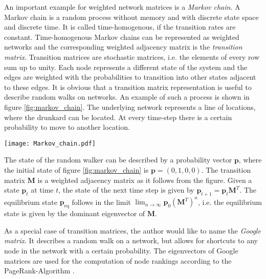 \documentclass[openright,twoside,headsepline]{scrbook}
\begin{document}
An important example for weighted network matrices is a \emph{Markov chain}.
A Markov chain is a random process without memory and with discrete state space and discrete time.
It is called time-homogenous, if the transition rates are constant.
Time-homogenous Markov chains can be represented as weighted networks and the corresponding weighted adjacency matrix is the \emph{transition matrix}.
Transition matrices are stochastic matrices, i.e. the elements of every row sum up to unity.
Each node represents a different state of the system and the edges are weighted with the probabilities to transition into other states adjacent to these edges.
It is obvious that a transition matrix representation is useful to describe random walks on networks.
An example of such a process is shown in figure \ref{fig:markov_chain}.
The underlying network represents a line of locations, where the drunkard can be located.
At every time-step there is a certain probability to move to another location.
%
\begin{SCfigure}%
\texttt{[image: Markov\_chain.pdf]}
\caption{Trajectory of a toddling drunk man as an example of a Markov chain.
At every location there is a probability for the drunkard to go left or right.
The node rightmost node is an absorbing state and could model a park bench.
Weights at arrowheads mark the transition probability.
(inspired by \citep{Aldous_book}).}
\label{fig:markov_chain}
\end{SCfigure}
%
The state of the random walker can be described by a probability vector $\mathbf{p}$, where the initial state of figure \ref{fig:markov_chain} is $\mathbf{p}=(0,1,0,0)$.
The transition matrix $\mathbf{M}$ is a weighted adjacency matrix as it follows from the figure.
Given a state $\mathbf{p}_{t}$ at time $t$, the state of the next time step is given by $\mathbf{p}_{t+1}=\mathbf{p}_t \mathbf{M}^T$.
The equilibrium state $\mathbf{p}_\mathrm{eq}$ follows in the limit $\lim _{n\rightarrow \infty } \mathbf{p}_0 (\mathbf{M}^T)^n$, i.e. the equilibrium state is given by the dominant eigenvector of $\mathbf{M}$.

As a special case of transition matrices, the author would like to name the \emph{Google matrix}.
It describes a random walk on a network, but allows for shortcuts to any node in the network with a certain probability.
The eigenvectors of Google matrices are used for the computation of node rankings according to the PageRank-Algorithm \citep{PageRank:}.
\end{document}
